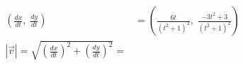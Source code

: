 \documentclass[preview]{standalone}
\begin{document}
\begin{align*}
\left(\frac{dx}{dt}, \; \frac{dy}{dt}\right) &= \left(\frac{6t}{(t^2 +1)^2}, \; \frac{-3t^2 + 3}{(t^2 + 1)^2}\right) \\ |\vec{v}| = \sqrt{\left(\frac{dx}{dt}\right)^2 + \left(\frac{dy}{dt}\right)^2} =
\end{align*}
\end{document}
